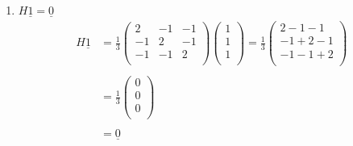 \documentclass[11pt,a4paper]{article}
\theoremstyle{definition}
\begin{document}
\begin{enumerate}
\item $H\underline{1} = \underline{0}$
\begin{align*}
H\underline{1} & = \frac{1}{3}\begin{pmatrix}
2 & -1 & -1\\
-1 & 2 & -1\\
-1 & -1 & 2\\
\end{pmatrix}
\begin{pmatrix}
1\\
1\\
1\\
\end{pmatrix}= \frac{1}{3}\begin{pmatrix}
2-1-1\\
-1+2-1\\
-1-1+2\\
\end{pmatrix}\\\\
& = \frac{1}{3}\begin{pmatrix}
0\\
0\\
0\\
\end{pmatrix}\\\\
& = \underline{0}\\
\end{align*}




\end{enumerate}
\end{document}
